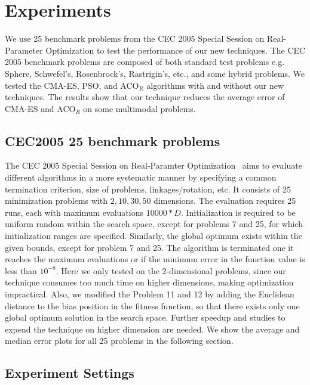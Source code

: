 \chapter{Experiments}
\label{chapter:experiments}

We use 25 benchmark problems from the CEC 2005 Special Session on Real-Parameter Optimization to test the performance of our new techniques.
The CEC 2005 benchmark problems are composed of both standard test problems e.g. Sphere, Schwefel's, Rosenbrock's, Rastrigin's, etc.,
and some hybrid problems.
We tested the CMA-ES, PSO, and ACO$_R$ algorithms with and without our new techniques.
The results show that our technique reduces the average error of CMA-ES and ACO$_R$ on some multimodal problems.  

\section{CEC2005 25 benchmark problems}

The CEC 2005 Special Session on Real-Paramter Optimization~\cite{Suganthan:2005:benchmark} aims to evaluate different algorithms in a more systematic manner by specifying a common termination criterion, size of problems, linkages/rotation, etc.
It consists of 25 minimization problems with $2, 10, 30, 50$ dimensions.
The evaluation requires 25 runs, each with maximum evaluations $10000 * D$. 
Initialization is required to be uniform random within the search space, except for problems 7 and 25, for which initialization ranges are specified.
Similarly, the global optimum exists within the given bounds, except for problem 7 and 25.
The algorithm is terminated one it reaches the maximum evaluations or if the minimum error in the function value is less than $10^{-8}$.
Here we only tested on the 2-dimensional problems, 
since our technique consumes too much time on higher dimensions, 
making optimization impractical.  
Also, we modified the Problem 11 and 12 by adding the Euclidean distance to the bias position in the fitness function,
so that there exists only one global optimum solution in the search space.
Further speedup and studies to expend the technique on higher dimension are needed.
We show the average and median error plots for all 25 problems in the following section.


\section{Experiment Settings}

